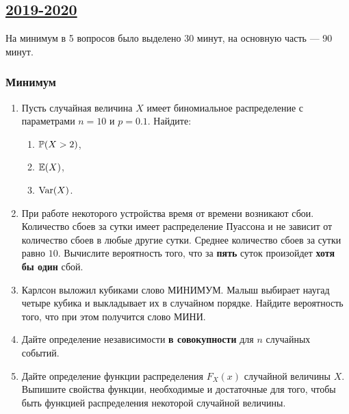 \subsection[2019-2020]{\hyperref[sec:sol_kr_01_2019_2020]{2019-2020}}
\label{sec:kr_01_2019_2020} %

На минимум в 5 вопросов было выделено 30 минут, на основную часть — 90 минут.

\subsubsection*{Минимум}

\begin{enumerate}

  
  \item Пусть случайная величина $X$ имеет биномиальное распределение с параметрами $n=10$ и $p=0.1$. Найдите:
  
  \begin{enumerate}
      \item $\P(X>2)$,
      \item $\E(X)$,
      \item $\Var(X)$.
  \end{enumerate}
  
  
  \item При работе некоторого устройства время от времени возникают сбои. Количество сбоев за сутки имеет
  распределение Пуассона и не зависит от количество сбоев в любые другие сутки. Среднее количество
  сбоев за сутки равно $10$. Вычислите вероятность того, что за \textbf{пять} суток произойдет \textbf{хотя бы один} сбой.
  
  
  \item Карлсон выложил кубиками слово МИНИМУМ. Малыш выбирает наугад четыре кубика и
  выкладывает их в случайном порядке. Найдите вероятность того, что при этом получится слово МИНИ.
  
  \item Дайте определение независимости \textbf{в совокупности} для $n$ случайных событий.
  
  \item Дайте определение функции распределения $F_{X}(x)$ случайной величины $X$. Выпишите свойства
  функции, необходимые и достаточные для того, чтобы быть функцией распределения некоторой случайной величины. 
  
  \end{enumerate}
  
